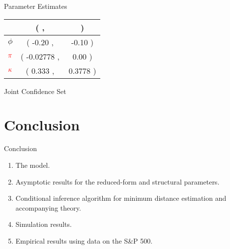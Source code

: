 \documentclass[smaller, aspectratio=169]{beamer}
\newcommand*{\rkappa}{\textcolor{red}{\kappa}}
\newcommand*{\rpi}{\textcolor{red}{\pi}}
\begin{document}
\begin{frame}[c]{Parameter Estimates}
\begin{minipage}{.49\textwidth}
\begin{table}[htb]
            \begin{tabularx}{.75\textwidth}{X | >{{(}} S[table-space-text-pre={(}] <{{,\,}}
              S[table-space-text-pre={\hspace{-1.5cm}}] <{{)}}}
%
            \toprule
            &  \\
            \midrule
            $\phi$   & -0.20 & -0.10    \\
            $\rpi$    & -0.02778 & 0.00   \\
            $\rkappa$   & 0.333 & 0.3778  \\
            \bottomrule 
          \end{tabularx}
        \end{table}
   \end{minipage}


\end{frame}



\begin{frame}[c]{Joint Confidence Set}
    \begin{figure}[htb]
    	
    	\centering
    	\label{fig:confidence_region}
    	
    \end{figure}

\end{frame}

\section{Conclusion}

\begin{frame}[c]{Conclusion}

  \begin{enumerate}
%
      \item[\cmark] The model.
      \bigskip
%
  \item[\cmark] Asymptotic results for the reduced-form and structural parameters.
      \bigskip
%
  \item[\cmark] Conditional inference algorithm for minimum distance estimation and accompanying theory. 
      \bigskip
%
    \item[\cmark] Simulation results. 
      \bigskip
%
    \item[\cmark] Empirical results using data on the S\&P 500.
%
  \end{enumerate}

\end{frame}
\end{document}

